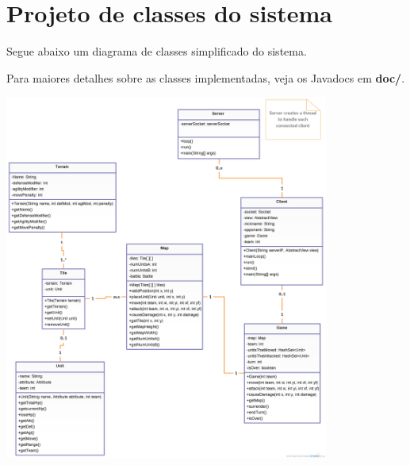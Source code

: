 \section{Projeto de classes do sistema}
    Segue abaixo um diagrama de classes simplificado do sistema. \par
    Para maiores detalhes sobre as classes implementadas, veja os Javadocs em \textbf{doc/}.
    
\includegraphics[width=0.8\textwidth]{projeto-de-classes.png}
